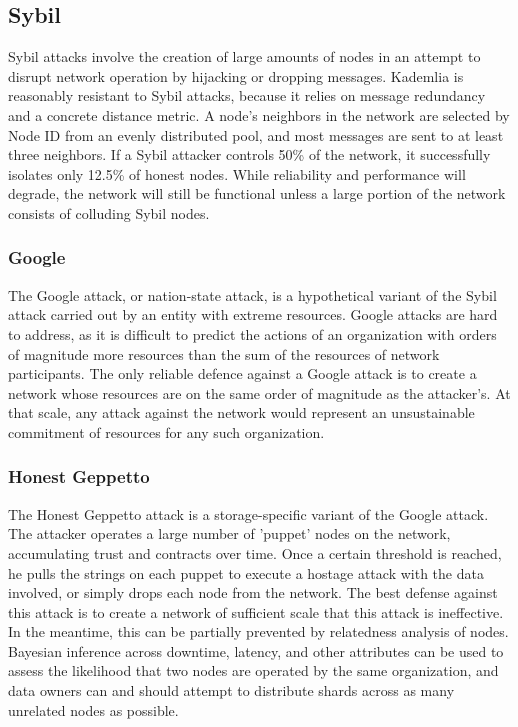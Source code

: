 \documentclass[a4paper,10pt]{article} \usepackage[utf8]{inputenc}
\begin{document}
\subsection{Sybil}

Sybil attacks involve the creation of large amounts of nodes in an attempt to
disrupt network operation by hijacking or dropping messages. Kademlia 
is reasonably
resistant to Sybil attacks, because
it relies on message redundancy and a concrete distance metric. 
A node's neighbors in the network are selected by
Node ID from an evenly distributed pool, and most messages are sent to at least
three neighbors. If a Sybil attacker controls 50\% of the network, it
successfully isolates only 12.5\% of honest nodes. While reliability and
performance will degrade, the network will still be functional unless a large
portion of the network consists of colluding Sybil nodes.

\subsubsection{Google}

The Google attack, or nation-state attack, is a hypothetical variant of the
Sybil attack carried out by an entity with extreme resources. Google attacks are
hard to address, as it is difficult to predict the actions of an organization
with orders of magnitude more resources than the sum of the resources of network
participants. The only reliable defence against a Google attack is to create a
network whose resources are on the same order of magnitude as the attacker's. At
that scale, any attack against the network would represent an unsustainable
commitment of resources for any such organization.

\subsubsection{Honest Geppetto}

The Honest Geppetto attack is a storage-specific variant of the Google attack.
The attacker operates a large number of 'puppet' nodes on the network,
accumulating trust and contracts over time. Once a certain threshold is reached,
he pulls the strings on each puppet to execute a hostage attack with the data
involved, or simply drops each node from the network. The best defense
against this attack is to create a network of sufficient scale that this attack
is ineffective. In the meantime, this can be partially prevented by relatedness
analysis of nodes. Bayesian inference across downtime, latency, and other
attributes can be used to assess the likelihood that two nodes are operated by
the same organization, and data owners can and should attempt to distribute
shards across as many unrelated nodes as possible.
\end{document}
